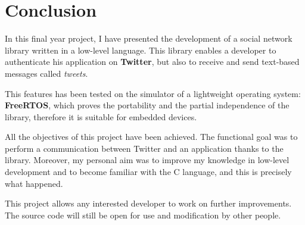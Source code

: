 \chapter{Conclusion}

\hspace{15mm}In this final year project, I have presented the development of a social network library written in a low-level language. This library enables a developer to authenticate his application on \textbf{Twitter}, but also to receive and send text-based messages called \textit{tweets}.

This features has been tested on the simulator of a lightweight operating system: \textbf{FreeRTOS}, which proves the portability and the partial independence of the library, therefore it is suitable for embedded devices.

All the objectives of this project have been achieved. The functional goal was to perform a communication between Twitter and an application thanks to the library. Moreover, my personal aim was to improve my knowledge in low-level development and to become familiar with the C language, and this is precisely what happened.

This project allows any interested developer to work on further improvements. The source code will still be open for use and modification by other people.


\clearpage